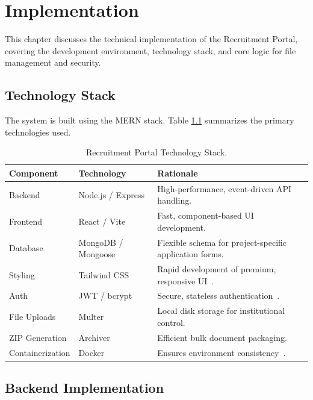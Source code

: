 \chapter{Implementation}

This chapter discusses the technical implementation of the Recruitment Portal, covering the development environment, technology stack, and core logic for file management and security.

\section{Technology Stack}

The system is built using the MERN stack. Table \ref{tab:stack} summarizes the primary technologies used.

\begin{table}[htbp]
  \centering
  \caption{Recruitment Portal Technology Stack.}
  \label{tab:stack}
  \begin{tabularx}{\textwidth}{llX}
    \hline
    \textbf{Component}    & \textbf{Technology}      & \textbf{Rationale} \\
    \hline
    Backend               & Node.js / Express        & High-performance, event-driven API handling. \\
    Frontend              & React / Vite             & Fast, component-based UI development. \\
    Database              & MongoDB / Mongoose       & Flexible schema for project-specific application forms. \\
    Styling               & Tailwind CSS             & Rapid development of premium, responsive UI~\cite{Tailwind2024}. \\
    Auth                  & JWT / bcrypt             & Secure, stateless authentication~\cite{RFC7519}. \\
    File Uploads          & Multer                   & Local disk storage for institutional control. \\
    ZIP Generation        & Archiver                 & Efficient bulk document packaging. \\
    Containerization      & Docker                   & Ensures environment consistency~\cite{Docker2024}. \\
    \hline
  \end{tabularx}
\end{table}

\section{Backend Implementation}

